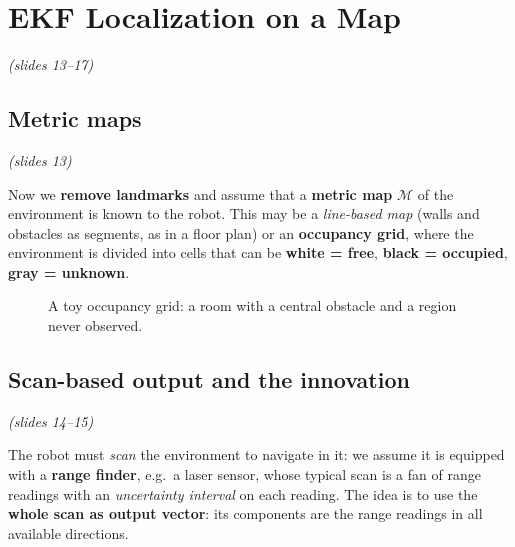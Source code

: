 \documentclass[11pt,a4paper]{article}
\theoremstyle{definition}
\theoremstyle{plain}
\theoremstyle{remark}
\newcommand{\slides}[1]{\par\vspace{-2pt}\noindent\emph{(slides #1)}\par\smallskip}
\begin{document}
\section{EKF Localization on a Map}
\slides{13--17}

\subsection{Metric maps}
\slides{13}

Now we \textbf{remove landmarks} and assume that a \textbf{metric map} $\mathcal M$ of the environment is known to the robot. This may be a \emph{line-based map} (walls and obstacles as segments, as in a floor plan) or an \textbf{occupancy grid}, where the environment is divided into cells that can be \textbf{white = free}, \textbf{black = occupied}, \textbf{gray = unknown}.

\begin{figure}[H]
\centering
{}
\caption{A toy occupancy grid: a room with a central obstacle and a region never observed.}
\label{fig:grid}
\end{figure}

\subsection{Scan-based output and the innovation}
\slides{14--15}

The robot must \emph{scan} the environment to navigate in it: we assume it is equipped with a \textbf{range finder}, e.g.\ a laser sensor, whose typical scan is a fan of range readings with an \emph{uncertainty interval} on each reading. The idea is to use the \textbf{whole scan as output vector}: its components are the range readings in all available directions.
\end{document}
